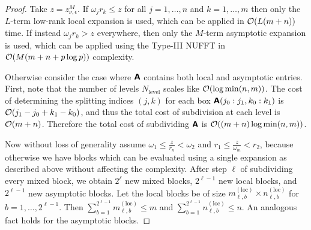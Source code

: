 \begin{proof}
    Take $z = z_{\nu, \epsilon}^M$. If $\omega_j r_k \leq z$ for all
    $j=1,\dots,n$ and $k=1,\dots,m$ then only the $L$-term low-rank local
    expansion is used, which can be applied in $\mathcal{O}(L(m + n))$ time. If instead
    $\omega_j r_k > z$ everywhere, then only the $M$-term asymptotic expansion
    is used, which can be applied using the Type-III NUFFT in $\mathcal{O}(M(m + n +
    p\log p))$ complexity.

    Otherwise consider the case where $\bm{\mathsf{A}}$ contains both local and
    asymptotic entries. First, note that the number of levels
    $N_{\text{level}}$ scales like $\mathcal{O}(\log\min(n,m))$. The cost of determining the splitting indices $(j,k)$ for each box $\bm{\mathsf{A}}(j_0:j_1,k_0:k_1)$ is $\mathcal{O}(j_1-j_0+k_1-k_0)$, and thus the total cost of subdivision at each level is $\mathcal{O}(m+n)$. Therefore the total cost of subdividing $\bm{\mathsf{A}}$ is $\mathcal{O}((m+n)\log\min(n,m))$.
    
    Now without loss of generality assume $\omega_1 \leq
    \frac{z}{r_n} < \omega_2$ and $r_1 \leq \frac{z}{\omega_m} < r_2$, because
    otherwise we have blocks which can be evaluated using a single expansion as
    described above without affecting the complexity. After step $\ell$ of subdividing every mixed block, we obtain $2^{\ell}$ new
    mixed blocks, $2^{\ell-1}$ new local blocks, and $2^{\ell-1}$ new asymptotic
    blocks. Let the local blocks be of size $m_{\ell,b}^{(\text{loc})} \times
    n_{\ell,b}^{(\text{loc})}$ for $b = 1,\dots,2^{\ell-1}$. Then
    $\sum_{b=1}^{2^{\ell-1}} m_{\ell,b}^{(\text{loc})} \leq m$ and
    $\sum_{b=1}^{2^{\ell-1}} n_{\ell,b}^{(\text{loc})} \leq n$. An analogous
    fact holds for the asymptotic blocks.
    

\end{proof}
